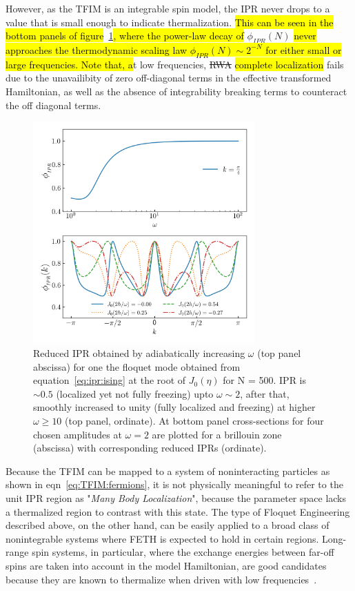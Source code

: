 \documentclass[%
reprint,
superscriptaddress,
linenumbers,
amsmath,amssymb,
aps,
prb,
showkeys,
]{revtex4-2}
\begin{document}
	However, as the TFIM is an integrable spin model, the IPR never drops to a value that is small enough to indicate thermalization. \hl{This can be seen in the bottom panels of figure}~\ref{fig:ipr:isinglowfrk}\hl{, where the power-law decay of} $\phi_{IPR}(N)$ \hl{never approaches the thermodynamic scaling law $\phi_{IPR}(N)\sim 2^{-N}$ for either small or large frequencies. Note that, a}t low frequencies, \st{RWA} \hl{complete localization} fails due to the unavailibity of zero off-diagonal terms in the  effective transformed Hamiltonian, as well as the absence of integrability breaking terms to counteract the off diagonal terms. 
	\begin{figure}[t!]
		\centering
		\includegraphics[width = 8.5cm]{ising_exact_lowfr_ipr.jpeg}
		\caption{Reduced IPR obtained by adiabatically increasing $\omega$ (top panel abscissa) for one the floquet mode obtained from equation~\ref{eq:ipr:ising} at the root of $J_0(\eta)$ for N = 500. IPR is $\sim 0.5$ (localized yet not fully freezing) upto $\omega \sim 2$, after that, smoothly increased to unity (fully localized and freezing) at higher $\omega \geq 10$ (top panel, ordinate). At bottom panel cross-sections for four chosen amplitudes at $\omega =2$ are plotted for a brillouin zone (abscissa) with corresponding reduced IPRs (ordinate).}
		\label{fig:ipr:isinglowfrk}
	\end{figure}
	{Because the TFIM can be mapped to a system of noninteracting particles as shown in eqn}~\ref{eq:TFIM:fermions}, it is not physically meaningful to refer to the unit IPR region as "\emph{Many Body Localization}", because the parameter space lacks a thermalized region to contrast with this state. The type of Floquet Engineering described above, on the other hand, can be easily applied to a broad class of nonintegrable systems where FETH is expected to hold in certain regions. Long-range spin systems, in particular, where the exchange energies between far-off spins are taken into account in the model Hamiltonian, are good candidates because they are known to thermalize when driven with low frequencies~\cite{russomanno_thermalization_2015}.
\end{document}
